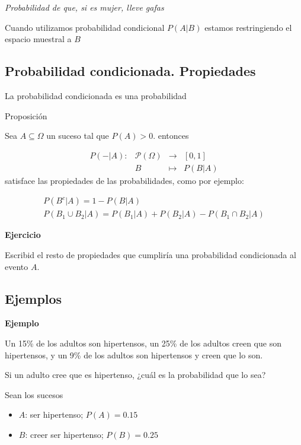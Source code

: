 \documentclass[]{book}
\providecommand{\tightlist}{%
  \setlength{\itemsep}{0pt}\setlength{\parskip}{0pt}}
\begin{document}
\emph{Probabilidad de que, si es mujer, lleve gafas}

Cuando utilizamos probabilidad condicional \(P(A|B)\) estamos restringiendo el espacio muestral a \(B\)

\hypertarget{probabilidad-condicionada.-propiedades}{%
\subsection{Probabilidad condicionada. Propiedades}\label{probabilidad-condicionada.-propiedades}}

La probabilidad condicionada es una probabilidad

Proposición

Sea \(A\subseteq \Omega\) un suceso tal que \(P(A)>0\). entonces

\[
\begin{array}{rccl}
P(-|A):& \mathcal{P}(\Omega) & \to & [0,1]\\
&B & \mapsto & P(B|A)
\end{array}
\]
satisface las propiedades de las probabilidades, como por ejemplo:

\[
\begin{array}{l}
P(B^c|A)=1-P(B|A)\\
P(B_1\cup B_2|A)=P(B_1|A)+P(B_2|A)-P(B_1\cap B_2|A)
\end{array}
\]

\textbf{Ejercicio}

Escribid el resto de propiedades que cumpliría una probabilidad condicionada al evento \(A\).

\hypertarget{ejemplos}{%
\subsection{Ejemplos}\label{ejemplos}}

\textbf{Ejemplo}

Un 15\% de los adultos son hipertensos, un 25\% de los adultos creen que son hipertensos, y un 9\% de los adultos son hipertensos y creen que lo son.

Si un adulto cree que es hipertenso, ¿cuál es la probabilidad que lo sea?

Sean los sucesos

\begin{itemize}
\tightlist
\item
  \(A\): ser hipertenso; \(P(A)=0.15\)
\item
  \(B\): creer ser hipertenso; \(P(B)=0.25\)
\end{itemize}
\end{document}
